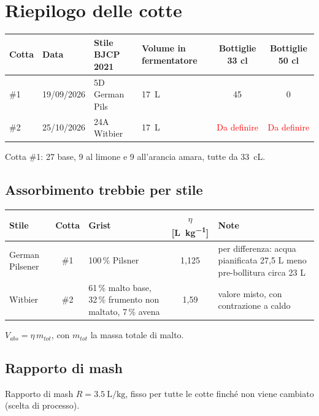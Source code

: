 \section{Riepilogo delle cotte}

\begin{tabularx}{\linewidth}{@{}lllXcc@{}}
\toprule
Cotta & Data & Stile BJCP 2021 & Volume in fermentatore & Bottiglie 33 cl & Bottiglie 50 cl \\
\midrule
\#1 & 19/09/2026 & 5D German Pils & \SI{17}{\liter} & 45 & 0 \\
\#2 & 25/10/2026 & 24A Witbier & \SI{17}{\liter} & \textcolor{red}{Da definire} & \textcolor{red}{Da definire} \\
\bottomrule
\end{tabularx}

\noindent Cotta \#1: 27 base, 9 al limone e 9 all'arancia amara, tutte da \SI{33}{\centi\liter}.

\subsection*{Assorbimento trebbie per stile}
\begin{tabularx}{\linewidth}{@{}lcXcX@{}}
\toprule
Stile & Cotta & Grist & $\eta$ [\si{\liter\per\kilo\gram}] & Note \\
\midrule
German Pilsener & \#1 & 100\,\% Pilsner & 1,125 & per differenza: acqua pianificata 27,5 L meno pre-bollitura circa 23 L \\
Witbier & \#2 & 61\,\% malto base, 32\,\% frumento non maltato, 7\,\% avena & 1,59 & valore misto, con contrazione a caldo \\
\bottomrule
\end{tabularx}

\noindent $V_{abs} = \eta\, m_{tot}$, con $m_{tot}$ la massa totale di malto.

\subsection*{Rapporto di mash}
Rapporto di mash $R = \SI{3,5}{\liter\per\kilo\gram}$, fisso per tutte le cotte finché non viene cambiato (scelta di processo).
